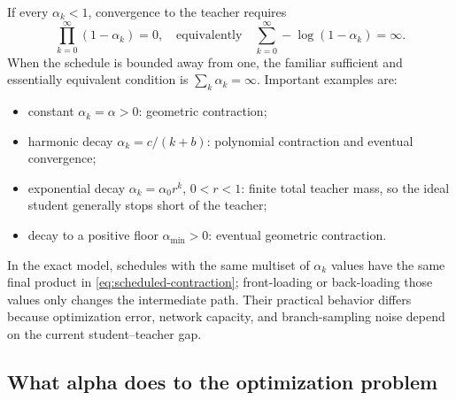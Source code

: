 \documentclass[11pt,a4paper]{article}
\theoremstyle{plain}
\theoremstyle{definition}
\begin{document}
If every $\alpha_k<1$, convergence to the teacher requires
\begin{equation}
\prod_{k=0}^{\infty}(1-\alpha_k)=0,
\quad\text{equivalently}\quad
\sum_{k=0}^{\infty}-\log(1-\alpha_k)=\infty.
\label{eq:schedule-convergence-condition}
\end{equation}
When the schedule is bounded away from one, the familiar sufficient and essentially equivalent
condition is $\sum_k\alpha_k=\infty$.  Important examples are:
\begin{itemize}[leftmargin=1.5em]
\item constant $\alpha_k=\alpha>0$: geometric contraction;
\item harmonic decay $\alpha_k=c/(k+b)$: polynomial contraction and eventual convergence;
\item exponential decay $\alpha_k=\alpha_0r^k$, $0<r<1$: finite total teacher mass, so the ideal
      student generally stops short of the teacher;
\item decay to a positive floor $\alpha_{\min}>0$: eventual geometric contraction.
\end{itemize}

In the exact model, schedules with the same multiset of $\alpha_k$ values have the same final
product in \eqref{eq:scheduled-contraction}; front-loading or back-loading those values only
changes the intermediate path.  Their practical behavior differs because optimization error,
network capacity, and branch-sampling noise depend on the current student--teacher gap.

\subsection{What alpha does to the optimization problem}
\end{document}

